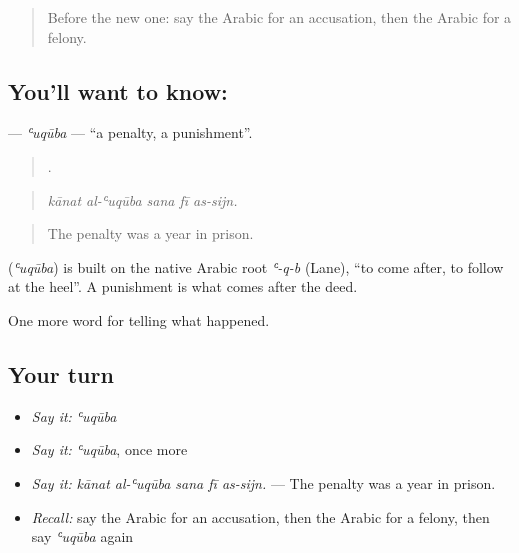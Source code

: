 \label{lesson:AR-C348-uquba}



\begin{quote}
Before the new one: say the Arabic for an accusation, then the Arabic for a felony.
\end{quote}

\subsection*{You'll want to know: }
\textbf{} — \emph{ʿuqūba} — \textquotedblleft{}a penalty, a punishment\textquotedblright{}.

\begin{quote}
    .
\end{quote}

\begin{quote}
\emph{kānat al-ʿuqūba sana fī as-sijn.}
\end{quote}

\begin{quote}
The penalty was a year in prison.
\end{quote}

\begin{cousinweb}
\textbf{} (\emph{ʿuqūba}) is built on the native Arabic root \emph{ʿ-q-b} (Lane), \textquotedblleft{}to come after, to follow at the heel\textquotedblright{}. A punishment is what comes after the deed.
\end{cousinweb}

\begin{grammarlens}[title={What you've built}]
One more word for telling what happened.
\end{grammarlens}

\subsection*{Your turn}
\begin{itemize}
\raggedright
  \item \emph{Say it:} \emph{ʿuqūba}
  \item \emph{Say it:} \emph{ʿuqūba}, once more
  \item \emph{Say it:} \emph{kānat al-ʿuqūba sana fī as-sijn.} — The penalty was a year in prison.
  \item \emph{Recall:} say the Arabic for an accusation, then the Arabic for a felony, then say \emph{ʿuqūba} again
\end{itemize}

